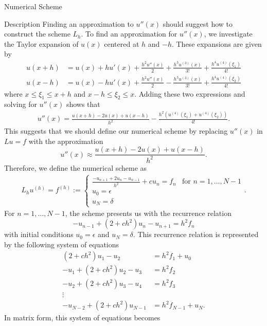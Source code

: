\documentclass{article}
\begin{document}
\begin{section}{Numerical Scheme}
\begin{subsection}{Description}
    Finding an approximation to $u''(x)$ should suggest how to construct
    the scheme $L_h$.
    To find an approximation for $u''(x)$, we investigate the Taylor expansion
    of $u(x)$ centered at $h$ and $-h$. These expansions are given by
    \begin{align*}
      u(x + h) &= u(x) + h u'(x) + \frac{h^2 u ''(x)}{2} + \frac{h^3 u^{(3)}(x)}{3!} + \frac{h^4 u^{(4)}(\xi_1)}{4!} \\
      u(x - h) &= u(x) - h u'(x) + \frac{h^2 u ''(x)}{2} - \frac{h^3 u^{(3)}(x)}{3!} + \frac{h^4 u^{(4)}(\xi_2)}{4!}
    \end{align*}
    where $x \leq \xi_1 \leq x + h$ and $x - h \leq \xi_2 \leq x$.
    Adding these two expressions and solving for $u''(x)$ shows that
    \begin{align}\label{second_deriv}
      u''(x) = \frac{u(x + h) - 2u(x) + u(x-h)}{h^2} - \frac{h^2(u^{(4)}(\xi_1) + u^{(4)}(\xi_2))}{4!}.
    \end{align}
    This suggests that we should define our numerical scheme by replacing $u''(x)$
    in $Lu = f$ with the approximation
    \[
      u''(x) \approx \frac{u(x + h) - 2u(x) + u(x-h)}{h^2}.
    \]
    Therefore, we define the numerical scheme as
    \begin{align*}
      L_h u^{(h)} = f^{(h)} :=
      \begin{cases}
        \frac{-u_{n+1} + 2 u_n - u_{n-1}}{h^2} + c u_n = f_n & \text{for $n= 1, \dots, N - 1$} \\
        u_0 = \epsilon \\
        u_N = \delta
      \end{cases}.
    \end{align*}
    For $n=1,\dots,N-1$, the scheme presents us with the recurrence relation
    \[
      -u_{n-1} + (2 + ch^2) u_n - u_{n+1} = h^2 f_n
    \]
    with initial conditions $u_0 = \epsilon$ and $u_N = \delta$. This recurrence
    relation is represented by the following system of equations
    \begin{align*}
      (2 + ch^2) u_1 - u_2 &= h^2f_1 + u_0 \\
      -u_1 + (2 + ch^2) u_2 - u_3 &= h^2f_2 \\
      -u_2 + (2 + ch^2) u_3 - u_4 &= h^2f_3 \\
      \vdots &  \\
      -u_{N-2} + (2 + ch^2) u_{N-1} &= h^2f_{N-1} + u_N.
    \end{align*}
    In matrix form, this system of equations becomes
    \begin{align*}

\end{align*}
\end{subsection}
\end{section}
\end{document}
